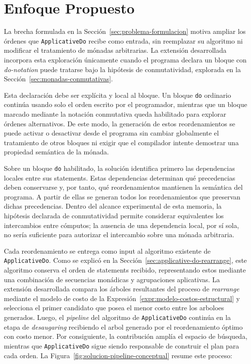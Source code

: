 
\section{Enfoque Propuesto}
\label{sec:solucion-enfoque}

La brecha formulada en la Sección~\ref{sec:problema-formulacion} motiva ampliar los órdenes que \texttt{ApplicativeDo} recibe como entrada, sin reemplazar su algoritmo ni modificar el tratamiento de mónadas arbitrarias. La extensión desarrollada incorpora esta exploración únicamente cuando el programa declara un bloque con \textit{do-notation} puede tratarse bajo la hipótesis de conmutatividad, explorada en la Sección~\ref{sec:monadas-conmutativas}.

Esta declaración debe ser explícita y local al bloque. Un bloque \texttt{do} ordinario continúa usando solo el orden escrito por el programador, mientras que un bloque marcado mediante la notación conmutativa queda habilitado para explorar órdenes alternativos. De este modo, la generación de estos reordenamientos se puede activar o desactivar desde el programa sin cambiar globalmente el tratamiento de otros bloques ni exigir que el compilador intente demostrar una propiedad semántica de la mónada.

Sobre un bloque \texttt{do} habilitado, la solución identifica primero las dependencias locales entre sus statements. Estas dependencias determinan qué precedencias deben conservarse y, por tanto, qué reordenamientos mantienen la semántica del programa. A partir de ellas se generan todos los reordenamientos que preservan dichas precedencias. Dentro del alcance experimental de esta memoria, la hipótesis declarada de conmutatividad permite considerar equivalentes los intercambios entre cómputos; la ausencia de una dependencia local, por sí sola, no sería suficiente para autorizar el intercambio sobre una mónada arbitraria.

Cada reordenamiento se entrega como input al algoritmo existente de \texttt{ApplicativeDo}. Como se explicó en la Sección~\ref{sec:applicative-do-rearrange}, este algoritmo conserva el orden de statements recibido, representando estos mediante una combinación de secuencias monádicas y agrupaciones aplicativas. La extensión desarrollada compara los árboles resultantes del proceso de \textit{rearrange} mediante el modelo de costo de la Expresión~\ref{expr:modelo-costos-estructural} y selecciona el primer candidato que posea el menor costo entre los arboloes generados. Luego, el \textit{pipeline} del algoritmo de \texttt{ApplicativeDo} continúa en la etapa de \textit{desaugaring} recibiendo el arbol generado por el reordenamiento óptimo con costo menor. Por consiguiente, la contribución amplía el espacio de búsqueda, mientras que \texttt{ApplicativeDo} sigue siendo responsable de construir el plan para cada orden. La Figura~\ref{fig:solucion-pipeline-conceptual} resume este proceso:

